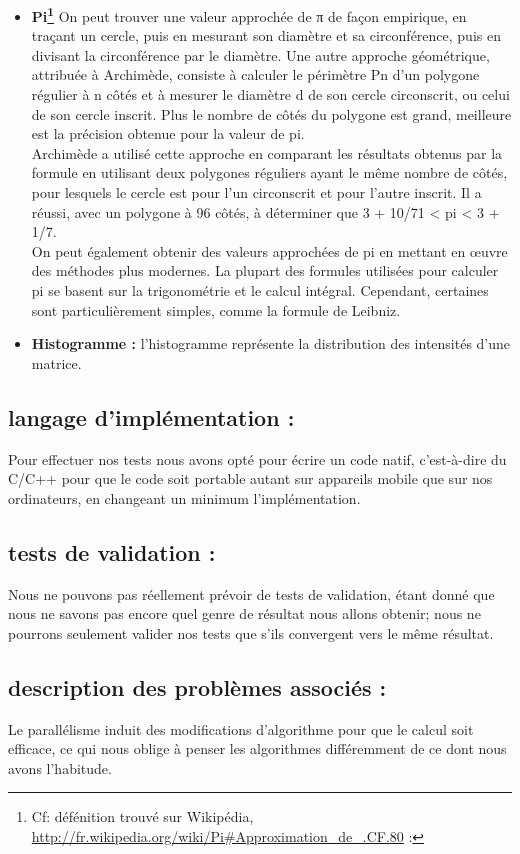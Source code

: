 \begin{itemize}
	\newpage
	\item{ \textbf{Pi\footnote{Cf: défénition trouvé sur Wikipédia, \url{http://fr.wikipedia.org/wiki/Pi#Approximation_de_.CF.80} :}} On peut trouver une valeur approchée de π de façon empirique, en traçant un cercle, puis en mesurant son diamètre et sa circonférence, puis en divisant la circonférence par le diamètre. Une autre approche géométrique, attribuée à Archimède, consiste à calculer le périmètre Pn d’un polygone régulier à n côtés et à mesurer le diamètre d de son cercle circonscrit, ou celui de son cercle inscrit. Plus le nombre de côtés du polygone est grand, meilleure est la précision obtenue pour la valeur de pi.\\
	Archimède a utilisé cette approche en comparant les résultats obtenus par la formule en utilisant deux polygones réguliers ayant le même nombre de côtés, pour lesquels le cercle est pour l’un circonscrit et pour l’autre inscrit. Il a réussi, avec un polygone à 96 côtés, à déterminer que 3 + 10/71 < pi < 3 + 1/7.\\
	On peut également obtenir des valeurs approchées de pi en mettant en œuvre des méthodes plus modernes. La plupart des formules utilisées pour calculer pi se basent sur la trigonométrie et le calcul intégral. Cependant, certaines sont particulièrement simples, comme la formule de Leibniz. \\}

	\item{ \textbf{Histogramme :} l’histogramme représente la distribution des intensités d'une matrice.}
	\end{itemize}

	\subsection*{langage d'implémentation :}
		Pour effectuer nos tests nous avons opté pour écrire un code natif, c'est-à-dire du C/C++ pour que le code soit portable autant sur appareils mobile que sur nos ordinateurs, en changeant un minimum l'implémentation. 

	\subsection*{tests de validation :}
		Nous ne pouvons pas réellement prévoir de tests de validation, étant donné que nous ne savons pas encore quel genre de résultat nous allons obtenir; nous ne pourrons seulement valider nos tests que s'ils convergent vers le même résultat. 

	\subsection*{description des problèmes associés :}
		Le parallélisme induit des modifications d'algorithme pour que le calcul soit efficace, ce qui nous oblige à penser les algorithmes différemment de ce dont nous avons l'habitude.